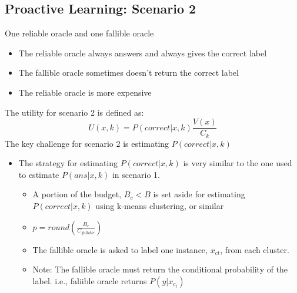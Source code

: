 \documentclass[10pt]{article}
\begin{document}
\subsection*{Proactive Learning: Scenario 2}
One reliable oracle and one fallible oracle
\begin{itemize}
	\item The reliable oracle always answers and always gives the correct label
	\item The fallible oracle sometimes doesn't return the correct label
	\item The reliable oracle is more expensive
\end{itemize}
The utility for scenario 2 is defined as:
\[U(x, k) = P(correct | x, k) \frac{V(x)}{C_k}\]
The key challenge for scenario 2 is estimating $P(correct | x, k)$
\begin{itemize}
	\item The strategy for estimating $P(correct | x, k)$ is very similar to the one used to estimate $P(ans | x, k)$ in scenario 1.
	\begin{itemize}
	    \item A portion of the budget, $B_c < B$ is set aside for estimating $P(correct | x, k)$ using k-means clustering, or similar
	    \item $p = round(\frac{B_c}{C_{fallible}})$
	    \item The fallible oracle is asked to label one instance, $x_{ct}$, from each cluster.
	    \item Note: The fallible oracle must return the conditional probability of the label.  i.e., faliible oracle returns $P(y | x_{c_t})$
    \end{itemize}
\end{itemize}
\end{document}
